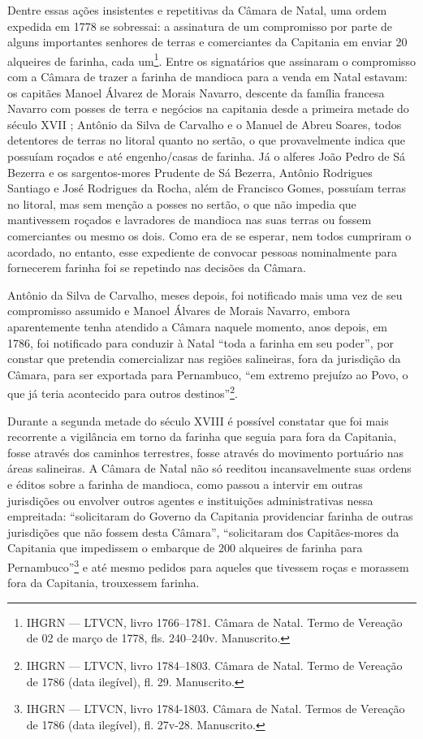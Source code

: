 \begin{refsection}
Dentre essas ações insistentes e repetitivas da Câmara de Natal, uma ordem expedida em 1778 se sobressai: a assinatura de um compromisso por parte de alguns importantes senhores de terras e comerciantes da Capitania em enviar 20 alqueires de farinha, cada um\footnote{IHGRN --- LTVCN, livro 1766--1781. Câmara de Natal. Termo de Vereação de 02 de março de 1778, fls. 240--240v. Manuscrito.}. Entre os signatários que assinaram o compromisso com a Câmara de trazer a farinha de mandioca para a venda em Natal estavam: os capitães Manoel Álvarez de Morais Navarro, descente da família francesa Navarro com posses de terra e negócios na capitania desde a primeira metade do século XVII \cite{Dias2016gentes}; Antônio da Silva de Carvalho e o Manuel de Abreu Soares, todos detentores de terras no litoral quanto no sertão, o que provavelmente indica que possuíam roçados e até engenho/casas de farinha. Já o alferes João Pedro de Sá Bezerra e os sargentos-mores Prudente de Sá Bezerra, Antônio Rodrigues Santiago e José Rodrigues da Rocha, além de Francisco Gomes, possuíam terras no litoral, mas sem menção a posses no sertão, o que não impedia que mantivessem roçados e lavradores de mandioca nas suas terras ou fossem comerciantes ou mesmo os dois. Como era de se esperar, nem todos cumpriram o acordado, no entanto, esse expediente de convocar pessoas nominalmente para fornecerem farinha foi se repetindo nas decisões da Câmara. 

Antônio da Silva de Carvalho, meses depois, foi notificado mais uma vez de seu compromisso assumido e Manoel Álvares de Morais Navarro, embora aparentemente tenha atendido a Câmara naquele momento, anos depois, em 1786, foi notificado para conduzir à Natal “toda a farinha em seu poder”, por constar que pretendia comercializar nas regiões salineiras, fora da jurisdição da Câmara, para ser exportada para Pernambuco, “em extremo prejuízo ao Povo, o que já teria acontecido para outros destinos”\footnote{IHGRN --- LTVCN, livro 1784--1803. Câmara de Natal. Termo de Vereação de 1786 (data ilegível), fl. 29. Manuscrito.}.  

Durante a segunda metade do século XVIII é possível constatar que foi mais recorrente a vigilância em torno da farinha que seguia para fora da Capitania, fosse através dos caminhos terrestres, fosse através do movimento portuário nas áreas salineiras. A Câmara de Natal não só reeditou incansavelmente suas ordens e éditos sobre a farinha de mandioca, como passou a intervir em outras jurisdições ou envolver outros agentes e instituições administrativas nessa empreitada: “solicitaram do Governo da Capitania providenciar farinha de outras jurisdições que não fossem desta Câmara”, “solicitaram dos Capitães-mores da Capitania que impedissem o embarque de 200 alqueires de farinha para Pernambuco”\footnote{IHGRN --- LTVCN, livro 1784-1803. Câmara de Natal. Termos de Vereação de 1786 (data ilegível), fl. 27v-28. Manuscrito.} e até mesmo pedidos para aqueles que tivessem roças e morassem fora da Capitania, trouxessem farinha.


\end{refsection}
